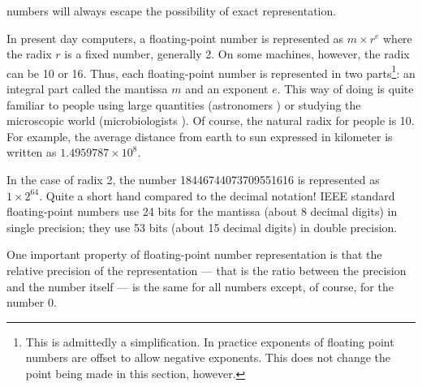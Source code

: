 numbers will always escape the possibility of exact
representation.
\par
In present day computers, a floating-point number is represented
as $m\times r^e$ where the radix $r$ is a fixed number, generally
2. On some machines, however, the radix can be 10 or 16. Thus,
each floating-point number is represented in two
parts\footnote{This is admittedly a simplification. In practice
exponents of floating point numbers are offset to allow negative
exponents. This does not change the point being made in this
section, however.}: an integral part called the mantissa $m$ and
an exponent $e$. This way of doing is quite familiar to people
using large quantities (astronomers \eg) or studying the
microscopic world (microbiologists \eg). Of course, the natural
radix for people is 10. For example, the average distance from
earth to sun expressed in kilometer is written as
$1.4959787\times10^8$.

In the case of radix 2, the number 18446744073709551616 is
represented as $1\times2^{64}$. Quite a short hand compared to the
decimal notation! IEEE standard floating-point numbers use 24 bits
for the mantissa (about 8 decimal digits) in single precision;
they use 53 bits (about 15 decimal digits) in double precision.
\par
One important property of floating-point number representation is
that the relative precision of the representation --- that is the
ratio between the precision and the number itself --- is the same
for all numbers except, of course, for the number 0.

